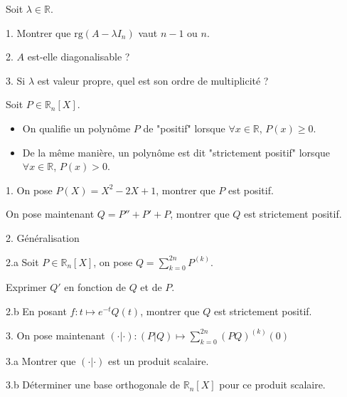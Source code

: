 \noindent Soit $\lambda \in \mathbb{R}$.

\vspace{5pt}
1. Montrer que $\mathrm{rg}(A-\lambda I_n)$ vaut $n-1$ ou $n$.

\vspace{5pt}
2. $A$ est-elle diagonalisable ?

\vspace{5pt}
3. Si $\lambda$ est valeur propre, quel est son ordre de multiplicité ?



\subetoiles
\columnbreak



\noindent Soit $P \in \mathbb{R}_n[X]$.
\begin{itemize}
  \item On qualifie un polynôme $P$ de "positif" lorsque $\forall x \in \mathbb{R}$, $P(x) \geqslant 0$.
  \item De la même manière, un polynôme est dit "strictement positif" lorsque $\forall x \in \mathbb{R}$, $P(x) > 0$.
\end{itemize}

\vspace{5pt}
1. On pose $P(X) = X^2 - 2X + 1$, montrer que $P$ est positif.

On pose maintenant $Q = P'' + P' + P$, montrer que $Q$ est strictement positif.

\vspace{5pt}
2. Généralisation

\vspace{5pt}
\quad 2.a Soit $P \in \mathbb{R}_n[X]$, on pose $\displaystyle Q = \sum_{k=0}^{2n}P^{(k)}$.

\quad Exprimer $Q'$ en fonction de $Q$ et de $P$.

\vspace{10pt}
\quad 2.b En posant $\displaystyle f : t \mapsto e^{-t}Q(t)$, montrer que $Q$ est strictement positif.

\vspace{10pt}
3. On pose maintenant $\displaystyle (\cdot | \cdot) : (P|Q) \mapsto \sum_{k=0}^{2n}(PQ)^{(k)}(0)$

\vspace{5pt}
\quad 3.a Montrer que $(\cdot | \cdot)$ est un produit scalaire.

\vspace{5pt}
\quad 3.b Déterminer une base orthogonale de $\mathbb{R}_n[X]$ pour ce produit scalaire.

